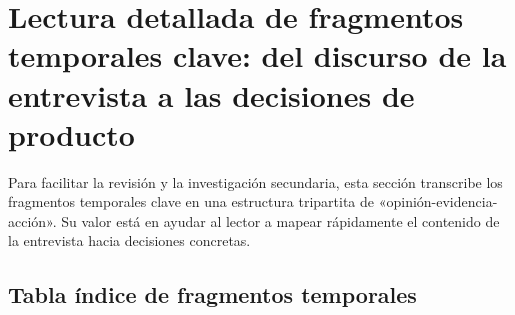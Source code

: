 \section{Lectura detallada de fragmentos temporales clave: del discurso de la entrevista a las decisiones de producto}

Para facilitar la revisión y la investigación secundaria, esta sección transcribe los fragmentos temporales clave en una estructura tripartita de «opinión-evidencia-acción». Su valor está en ayudar al lector a mapear rápidamente el contenido de la entrevista hacia decisiones concretas.

\subsection{Tabla índice de fragmentos temporales}

